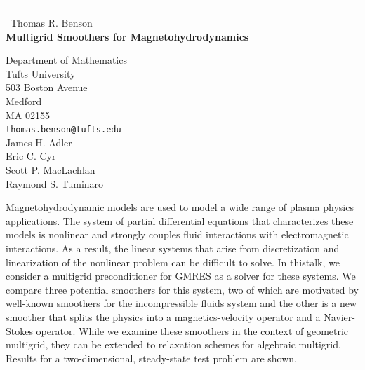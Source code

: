\documentclass{report}
\begin{document}
\begin{center}
\rule{6in}{1pt} \
{\large Thomas R. Benson \\
{\bf Multigrid Smoothers for Magnetohydrodynamics}}

Department of Mathematics \\ Tufts University \\ 503 Boston Avenue \\ Medford \\ MA 02155
\\
{\tt thomas.benson@tufts.edu}\\
James H. Adler\\
Eric C. Cyr\\
Scott P. MacLachlan\\
Raymond S. Tuminaro\end{center}

Magnetohydrodynamic models are used to model a wide range of plasma
physics applications. The system of partial differential equations
that characterizes these models is nonlinear and strongly couples
fluid interactions with electromagnetic interactions. As a result, the
linear systems that arise from discretization and linearization of the
nonlinear problem can be difficult to solve. In thistalk, we
consider a multigrid preconditioner for GMRES as a solver for these
systems. We compare three potential smoothers for this system, two of
which are motivated by well-known smoothers for the incompressible
fluids system and the other is a new smoother that splits the physics
into a magnetics-velocity operator and a Navier-Stokes operator. While
we examine these smoothers in the context of geometric multigrid, they
can be extended to relaxation schemes for algebraic multigrid. Results
for a two-dimensional, steady-state test problem are shown.
\end{document}

